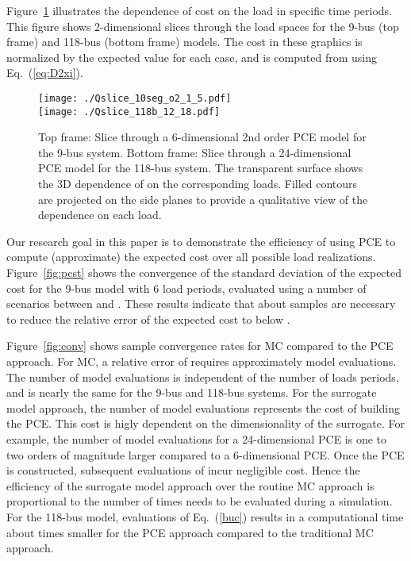 \documentclass[conference]{IEEEtran}
\begin{document}
Figure~\ref{fig:pcslice} illustrates the dependence of cost on the
load in specific time periods. This figure shows 2-dimensional slices
through the load spaces for the 9-bus (top frame) and 118-bus (bottom
frame) models. The cost  in these graphics is normalized by the
expected value for each case, and  is computed from  using Eq.~(\ref{eq:D2xi}).
\begin{figure}[h]
\centering 
\texttt{[image: ./Qslice\_10seg\_o2\_1\_5.pdf]} \\
\texttt{[image: ./Qslice\_118b\_12\_18.pdf]} 
\caption{\label{fig:pcslice} Top frame: Slice through a 6-dimensional
  2nd order PCE model for the 9-bus system. Bottom frame: Slice
  through a 24-dimensional PCE model for the 118-bus system. The
  transparent surface shows the 3D dependence of  on the
  corresponding loads. Filled contours are projected on the side
  planes to provide a qualitative view of the dependence on each
  load.}
\end{figure}

Our research goal in this paper is to demonstrate the efficiency of using
PCE to compute (approximate)
the expected cost over all possible load realizations. 
Figure~\ref{fig:pcst} shows the convergence of the standard deviation of
the expected cost for the 9-bus model with 6 load periods, evaluated
using a number of scenarios between  and . These results
indicate that about  samples are necessary to reduce the
relative error of the expected cost to below . 

Figure~\ref{fig:conv} shows sample convergence rates for MC
compared to the PCE approach. For MC, a relative error of
 requires approximately  model evaluations. The number of model
evaluations is independent of the number of loads periods, and is
nearly the same for the 9-bus and 118-bus systems. For the
surrogate model approach, the number of model evaluations represents
the cost of building the PCE. This cost is higly dependent on the
dimensionality of the surrogate. For example, the number of model
evaluations for a 24-dimensional PCE is one to two orders of magnitude
larger compared to a 6-dimensional PCE. Once the PCE is constructed,
subsequent evaluations of 
incur negligible cost.
Hence the efficiency of the surrogate model approach over the
routine MC approach is proportional to the number of times   needs to be evaluated during a simulation. For the
118-bus model,  evaluations of Eq.~(\ref{buc}) results in a
computational time about  times smaller for the PCE approach
compared to the traditional MC approach.
\end{document}
